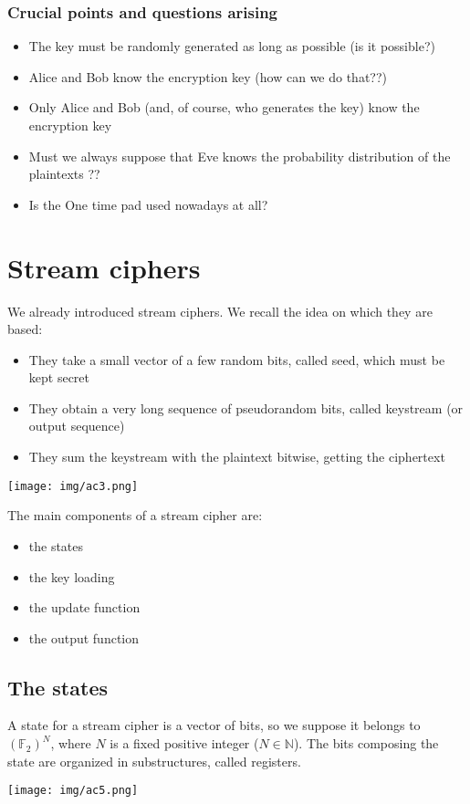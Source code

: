 \documentclass[a4paper, 10pt, titlepage]{article}
\begin{document}
\bigskip
\subsubsection*{Crucial points and questions arising}
\begin{itemize}
\item The key must be randomly generated as long as possible (is it
possible?)
\item Alice and Bob know the encryption key (how can we do that??)
\item Only Alice and Bob (and, of course, who generates the key) know the encryption key
\item Must we always suppose that Eve knows the probability distribution of the plaintexts ??
\item Is the One time pad used nowadays at all?
\end{itemize}
\newpage
\section{Stream ciphers}
We already introduced stream ciphers. We recall the idea on which they are based:
\begin{itemize}
\item They take a small vector of a few random bits, called seed, which must be kept secret
\item They obtain a very long sequence of pseudorandom bits, called keystream (or output sequence)
\item They sum the keystream with the plaintext bitwise, getting the
ciphertext
\end{itemize}

\begin{center}
\texttt{[image: img/ac3.png]}
\end{center}

The main components of a stream cipher are:
\begin{itemize}
\item the states
\item the key loading
\item the update function
\item the output function
\end{itemize}

\subsection*{The states}
A state for a stream cipher is a vector of bits, so we suppose it belongs to $(\mathbb{F}_2)^N$, where $N$ is a fixed positive integer ($N \in \mathbb{N}$).
The bits composing the state are organized in substructures, called registers.
\begin{center}
\texttt{[image: img/ac5.png]}
\end{center}
\end{document}

